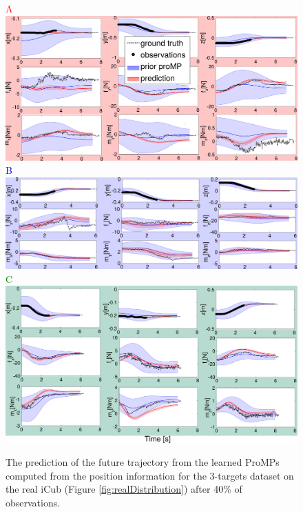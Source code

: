 \documentclass[utf8]{frontiersSCNS} %
\begin{document}
\begin{figure}[!h]
\centering
{
\textcolor{red}{A}\\
\includegraphics[width=15cm]{img/infA.pdf}\\
\textcolor{blue}{B}\\
\includegraphics[width=15cm]{img/infb.pdf}\\
\textcolor{green}{C}\\
\includegraphics[width=15cm]{img/infc.pdf}\\
}
\caption{The prediction of the future trajectory from the learned ProMPs computed from the position information for the  3-targets dataset on the real iCub (Figure \ref{fig:realDistribution}) after 40\% of observations.}
\label{fig:realTrajectoriesPredictions}
\end{figure}
\end{document}
